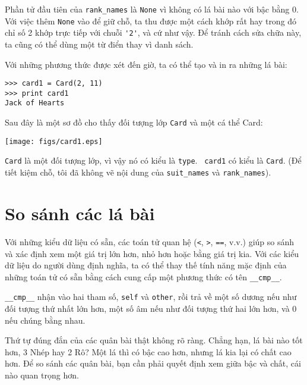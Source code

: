 \documentclass[11pt]{book}
\begin{document}
Phần tử đầu tiên của \verb"rank_names" là {\tt None} vì không có lá bài
nào với bậc bằng 0. Với việc thêm {\tt None} vào để giữ chỗ,
ta thu được một cách khớp rất hay trong đó chỉ số 2 khớp trực tiếp với
chuỗi \verb"'2'", và cứ như vậy. Để tránh cách sửa chữa này, ta cũng
có thể dùng một từ điển thay vì danh sách.

Với những phương thức được xét đến giờ, ta có thể tạo và in ra những lá bài:

\beforeverb
\begin{verbatim}
>>> card1 = Card(2, 11)
>>> print card1
Jack of Hearts
\end{verbatim}
\afterverb
%
Sau đây là một sơ đồ cho thấy đối tượng lớp {\tt Card} và một cá thể
Card:


\beforefig
\centerline{\texttt{[image: figs/card1.eps]}}
\afterfig

{\tt Card} là một đối tượng lớp, vì vậy nó có kiểu là {\tt type}.  {\tt
card1} có kiểu là {\tt Card}.  (Để tiết kiệm chỗ, tôi đã không vẽ
nội dung của \verb"suit_names" và \verb"rank_names").


\section{So sánh các lá bài}
\label{comparecard}


Với những kiểu dữ liệu có sẵn, các toán tử quan hệ 
({\tt <}, {\tt >}, {\tt ==}, v.v.)
giúp so sánh và xác định xem một giá trị lớn hơn, nhỏ hơn hoặc bằng 
giá trị kia. Với các kiểu dữ liệu do người dùng định nghĩa, ta có thể thay thế
tính năng mặc định của những toán tử có sẵn bằng cách cung cấp một
phương thức có tên 
\verb"__cmp__".  

\verb"__cmp__" nhận vào hai tham số, {\tt self} và {\tt other},
rồi trả về một số dương nếu như đối tượng thứ nhất lớn hơn, một
số âm nếu như đối tượng thứ hai lớn hơn, và 0 nếu chúng bằng nhau.


Thứ tự đúng đắn của các quân bài thật không rõ ràng. Chẳng hạn, lá bài nào
tốt hơn, 3 Nhép hay 2 Rô? Một lá thì có bậc cao hơn, nhưng lá kia lại có chất
cao hơn. Để so sánh các quân bài, bạn cần phải quyết định xem giữa bậc
và chất, cái nào quan trọng hơn.
\end{document}
